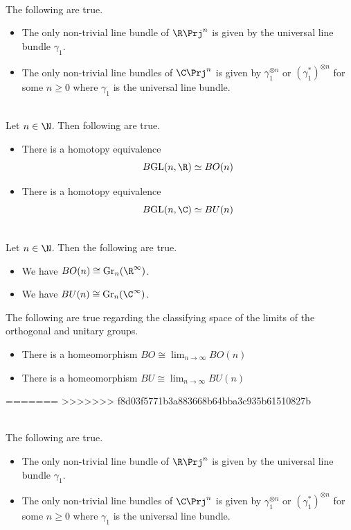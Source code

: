\documentclass[a4paper]{article}
\begin{document}
\begin{eg}{}{}\\
The following are true. 
\begin{itemize}
\item The only non-trivial line bundle of $\R\Prj^n$ is given by the universal line bundle $\gamma_1$. 
\item The only non-trivial line bundles of $\C\Prj^n$ is given by $\gamma_1^{\otimes n}$ or $(\gamma_1^\ast)^{\otimes n}$ for some $n\geq 0$ where $\gamma_1$ is the universal line bundle. 
\end{itemize}
\end{eg}

\begin{prp}{}{}\\
Let $n\in\N$. Then following are true. 
\begin{itemize}
\item There is a homotopy equivalence $$B\text{GL}(n,\R)\simeq BO(n)$$
\item There is a homotopy equivalence $$B\text{GL}(n,\C)\simeq BU(n)$$
\end{itemize}
\end{prp}

\begin{prp}{}{}\\
Let $n\in\N$. Then the following are true. 
\begin{itemize}
\item We have $BO(n)\cong\text{Gr}_n(\R^\infty)$. 
\item We have $BU(n)\cong\text{Gr}_n(\C^\infty)$. 
\end{itemize}
\end{prp}

\begin{prp}{}{} The following are true regarding the classifying space of the limits of the orthogonal and unitary groups. 
\begin{itemize}
\item There is a homeomorphism $BO\cong\lim_{n\to\infty}BO(n)$
\item There is a homeomorphism $BU\cong\lim_{n\to\infty}BU(n)$
\end{itemize}
\end{prp}
=======
>>>>>>> f8d03f5771b3a883668b64bba3c935b61510827b

\begin{eg}{}{}\\
The following are true. 
\begin{itemize}
\item The only non-trivial line bundle of $\R\Prj^n$ is given by the universal line bundle $\gamma_1$. 
\item The only non-trivial line bundles of $\C\Prj^n$ is given by $\gamma_1^{\otimes n}$ or $(\gamma_1^\ast)^{\otimes n}$ for some $n\geq 0$ where $\gamma_1$ is the universal line bundle. 
\end{itemize}
\end{eg}
\end{document}
